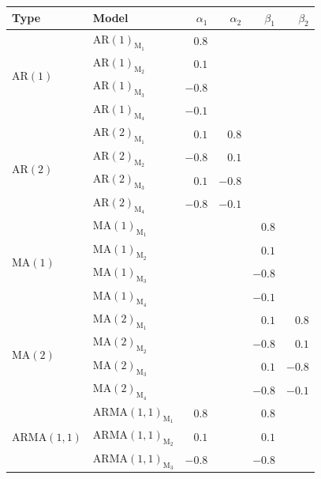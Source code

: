 \documentclass[12pt,a4paper]{article}
\begin{document}
	\begin{table}[H]
		\centering
		\begin{tabular}{llrrrr}
			\toprule
			\textbf{Type} & \textbf{Model} & $\alpha_1$ & $\alpha_2$ & $\beta_1$ & $\beta_2$ \\
			\midrule
			\multirow{4}[2]{*}{$\mathrm{AR}(1)$}      & $\mathrm{AR}(1)_{\textrm{M}_1}$  & $0.8$   &      &      &      \\
			& $\mathrm{AR}(1)_{\textrm{M}_2}$   & $0.1$   &      &      &      \\
			& $\mathrm{AR}(1)_{\textrm{M}_3}$   & $-0.8$  &      &      &      \\
			& $\mathrm{AR}(1)_{\textrm{M}_4}$   & $-0.1$  &      &      &      \\
			\midrule
			\multirow{4}[2]{*}{$\mathrm{AR}(2)$}      & $\mathrm{AR}(2)_{\textrm{M}_1}$   & $0.1$   & $0.8$  &      &      \\
			& $\mathrm{AR}(2)_{\textrm{M}_2}$  & $-0.8$  & $0.1$  &      &      \\
			& $\mathrm{AR}(2)_{\textrm{M}_3}$  & $0.1$   & $-0.8$ &      &      \\
			& $\mathrm{AR}(2)_{\textrm{M}_4}$  & $-0.8$  & $-0.1$ &      &      \\
			\midrule
			\multirow{4}[2]{*}{	$\mathrm{MA}(1)$}      & $\mathrm{MA}(1)_{\textrm{M}_1}$ &       &      & $0.8$  &      \\
			& $\mathrm{MA}(1)_{\textrm{M}_2}$  &       &      & $0.1$  &      \\
			& $\mathrm{MA}(1)_{\textrm{M}_3}$  &       &      & $-0.8$ &      \\
			& $\mathrm{MA}(1)_{\textrm{M}_4}$  &       &      & $-0.1$ &      \\
			\midrule
			\multirow{4}[2]{*}{$\mathrm{MA}(2)$}      & $\mathrm{MA}(2)_{\textrm{M}_1}$  &       &      & $0.1$  & $0.8$  \\
			& $\mathrm{MA}(2)_{\textrm{M}_2}$  &       &      & $-0.8$ & $0.1$  \\
			& $\mathrm{MA}(2)_{\textrm{M}_3}$  &       &      & $0.1$  & $-0.8$ \\
			& $\mathrm{MA}(2)_{\textrm{M}_4}$  &       &      & $-0.8$ & $-0.1$ \\
			\midrule
			\multirow{4}[2]{*}{$\mathrm{ARMA}(1,1)$}  & $\mathrm{ARMA}(1,1)_{\textrm{M}_1}$ & $0.8$ &      & $0.8$  &      \\
			& $\mathrm{ARMA}(1,1)_{\textrm{M}_2}$ & $0.1$ &      & $0.1$  &      \\
			& $\mathrm{ARMA}(1,1)_{\textrm{M}_3}$ & $-0.8$ &     & $-0.8$ &      \\

\end{tabular}
\end{table}
\end{document}

